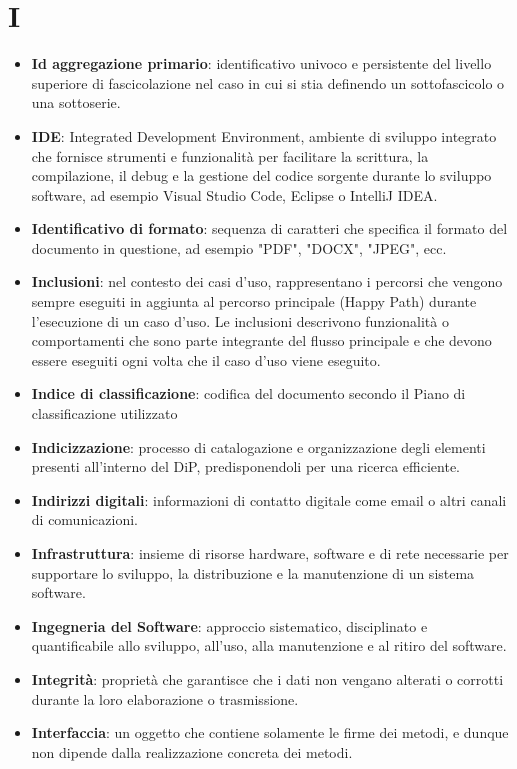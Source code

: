 \documentclass[a4paper,12pt]{article}
\begin{document}
\section{I}
\begin{itemize}
    \item \textbf{Id aggregazione primario}: identificativo univoco e persistente del livello superiore di fascicolazione nel caso in cui si stia definendo un sottofascicolo o una sottoserie.
    \item \textbf{IDE}: Integrated Development Environment, ambiente di sviluppo integrato che fornisce strumenti e funzionalità per facilitare la scrittura, la compilazione, il debug e la gestione del codice sorgente durante lo sviluppo software, ad esempio Visual Studio Code, Eclipse o IntelliJ IDEA.
    \item \textbf{Identificativo di formato}: sequenza di caratteri che specifica il formato del documento in questione, ad esempio "PDF", "DOCX", "JPEG", ecc.
    \item \textbf{Inclusioni}: nel contesto dei casi d'uso, rappresentano i percorsi che vengono sempre eseguiti in aggiunta al percorso principale (Happy Path) durante l'esecuzione di un caso d'uso. Le inclusioni descrivono funzionalità o comportamenti che sono parte integrante del flusso principale e che devono essere eseguiti ogni volta che il caso d'uso viene eseguito.
    \item \textbf{Indice di classificazione}: codifica del documento secondo il Piano di classificazione utilizzato
    \item \textbf{Indicizzazione}: processo di catalogazione e organizzazione degli elementi presenti all'interno del DiP, predisponendoli per una ricerca efficiente.
    \item \textbf{Indirizzi digitali}: informazioni di contatto digitale come email o altri canali di comunicazioni.
    \item \textbf{Infrastruttura}: insieme di risorse hardware, software e di rete necessarie per supportare lo sviluppo, la distribuzione e la manutenzione di un sistema software.
    \item \textbf{Ingegneria del Software}: approccio sistematico, disciplinato e quantificabile allo sviluppo, all'uso, alla manutenzione e al ritiro del software.
    \item \textbf{Integrità}: proprietà che garantisce che i dati non vengano alterati o corrotti durante la loro elaborazione o trasmissione.
    \item \textbf{Interfaccia}: un oggetto che contiene solamente le firme dei metodi, e dunque non dipende dalla realizzazione concreta dei metodi. 

\end{itemize}
\end{document}
